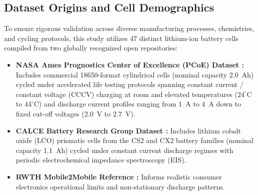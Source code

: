 \documentclass[a4paper,fleqn]{cas-sc}
\begin{document}
\subsection{Dataset Origins and Cell Demographics}
To ensure rigorous validation across diverse manufacturing processes, chemistries, and cycling protocols, this study utilizes 47 distinct lithium-ion battery cells compiled from two globally recognized open repositories:
\begin{itemize}
    \item \textbf{NASA Ames Prognostics Center of Excellence (PCoE) Dataset \cite{saha2007nasa}:} Includes commercial 18650-format cylindrical cells (nominal capacity 2.0~Ah) cycled under accelerated life testing protocols spanning constant current / constant voltage (CCCV) charging at room and elevated temperatures ($24^\circ$C to $44^\circ$C) and discharge current profiles ranging from 1~A to 4~A down to fixed cut-off voltages ($2.0$~V to $2.7$~V).
    \item \textbf{CALCE Battery Research Group Dataset \cite{calce2011battery}:} Includes lithium cobalt oxide (LCO) prismatic cells from the CS2 and CX2 battery families (nominal capacity 1.1~Ah) cycled under constant current discharge regimes with periodic electrochemical impedance spectroscopy (EIS).
    \item \textbf{RWTH Mobile2Mobile Reference \cite{rwth2026mobile}:} Informs realistic consumer electronics operational limits and non-stationary discharge patterns.
\end{itemize}
\end{document}
